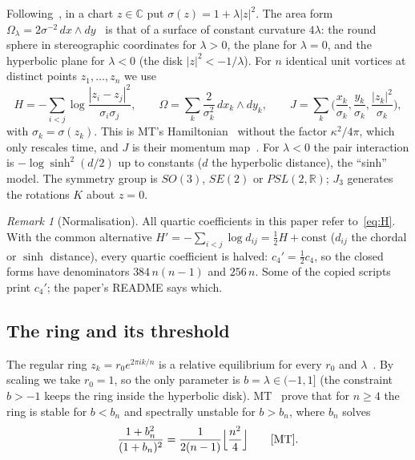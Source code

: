 \documentclass[11pt]{article}
\numberwithin{equation}{section}
\theoremstyle{definition}
\theoremstyle{remark}
\newtheorem{remark}[theorem]{Remark}
\newcommand{\R}{\mathbb{R}}
\newcommand{\C}{\mathbb{C}}
\begin{document}
Following~\cite{MT}, in a chart $z\in\C$ put $\sigma(z)=1+\lambda|z|^2$. The area form
$\Omega_\lambda=2\sigma^{-2}\,dx\wedge dy$~\cite[(1.8)]{MT} is that of a surface of constant curvature
$4\lambda$: the round sphere in stereographic coordinates for $\lambda>0$, the plane for $\lambda=0$, and
the hyperbolic plane for $\lambda<0$ (the disk $|z|^2<-1/\lambda$). For $n$ identical unit vortices at
distinct points $z_1,\dots,z_n$ we use
\begin{equation}\label{eq:H}
H=-\sum_{i<j}\log\frac{|z_i-z_j|^2}{\sigma_i\sigma_j},\qquad
\Omega=\sum_k\frac{2}{\sigma_k^2}\,dx_k\wedge dy_k,\qquad
J=\sum_k\Big(\frac{x_k}{\sigma_k},\frac{y_k}{\sigma_k},\frac{|z_k|^2}{\sigma_k}\Big),
\end{equation}
with $\sigma_k=\sigma(z_k)$. This is MT's Hamiltonian~\cite[(1.12)]{MT} without the factor
$\kappa^2/4\pi$, which only rescales time, and $J$ is their momentum map~\cite[(1.9)]{MT}. For
$\lambda<0$ the pair interaction is $-\log\sinh^2(d/2)$ up to constants ($d$ the hyperbolic distance),
the ``sinh'' model. The symmetry group is $SO(3)$, $SE(2)$ or $PSL(2,\R)$; $J_3$ generates the rotations
$K$ about $z=0$.

\begin{remark}[Normalisation]\label{rem:norm}
All quartic coefficients in this paper refer to~\eqref{eq:H}. With the common alternative
$H'=-\sum_{i<j}\log d_{ij}=\tfrac12H+\text{const}$ ($d_{ij}$ the chordal or $\sinh$ distance), every
quartic coefficient is halved: $c_4'=\tfrac12c_4$, so the closed forms have denominators $384\,n(n-1)$ and
$256\,n$. Some of the copied scripts print $c_4'$; the paper's README says which.
\end{remark}

\subsection{The ring and its threshold}

The regular ring $z_k=r_0e^{2\pi ik/n}$ is a relative equilibrium for every $r_0$ and
$\lambda$~\cite[(2.1)]{MT}. By scaling we take $r_0=1$, so the only parameter is $b=\lambda\in(-1,1]$
(the constraint $b>-1$ keeps the ring inside the hyperbolic disk). MT~\cite[Thm.~6]{MT} prove that for
$n\ge4$ the ring is stable for $b<b_n$ and spectrally unstable for $b>b_n$, where $b_n$ solves
\begin{equation}\label{eq:bn}
\frac{1+b_n^2}{(1+b_n)^2}=\frac{1}{2(n-1)}\Big\lfloor\frac{n^2}{4}\Big\rfloor\qquad\text{\cite[(3.6)]{MT}}.
\end{equation}
\end{document}
